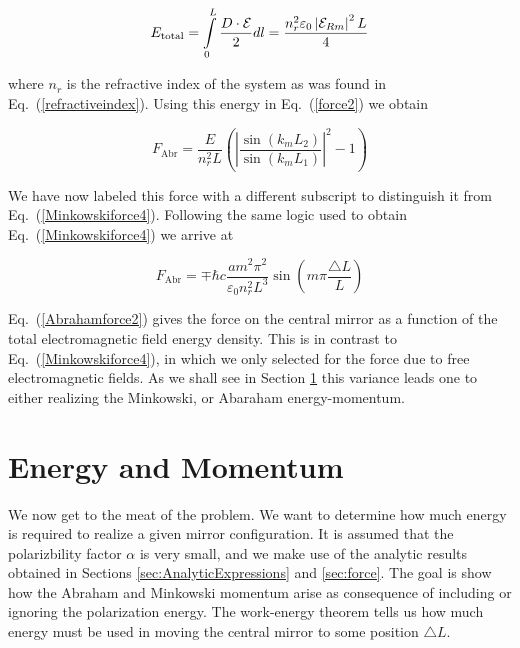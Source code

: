 \documentclass[twocolumn,english,pra,aps,superscriptaddress,floatfix]{revtex4-1}
\begin{document}
\begin{equation}
E_{\mathrm{total}}=\intop_{0}^{L}\frac{D\cdot \mathcal{E}}{2}dl=\frac{n_{r}^{2}\varepsilon_{0}\left| \mathcal{E}_{Rm}\right|^{2}L}{4}
\label{energydensity2}
\end{equation}

where $n_{r}$ is the refractive index of the system as was found in Eq.\ (\ref{refractiveindex}).
Using this energy in Eq.\ (\ref{force2}) we obtain

\begin{equation}
F_{\mathrm{Abr}}=\frac{E}{n_{r}^{2}L}\left(\left|\frac{\sin(k_{m}L_{2})}{\sin(k_{m}L_{1})}\right|^{2}-1\right)
\label{Abrahamforce1}
\end{equation}

We have now labeled this force with a different subscript to distinguish it from Eq.\ (\ref{Minkowskiforce4}).  
Following the same logic used to obtain Eq.\ (\ref{Minkowskiforce4}) we arrive at 

\begin{equation}
F_{\mathrm{Abr}}=\mp\hbar c\frac{a m^{2}\pi^{2}}{\varepsilon_{0}n_{r}^{2}L^{3}}\sin(m\pi\frac{\triangle L}{L})
\label{Abrahamforce2}
\end{equation}

Eq.\ (\ref{Abrahamforce2}) gives the force on the central mirror as a function of the total electromagnetic field energy density.  This is in contrast to Eq.\ (\ref{Minkowskiforce4}), in which we only selected for the force due to free electromagnetic fields.  As we shall see in Section \ref{sec:Energy} this variance leads one to either realizing the Minkowski, or Abaraham energy-momentum.  



\section{Energy and Momentum}
\label{sec:Energy}

We now get to the meat of the problem. We want to determine how much energy is required to realize a given mirror configuration. It is assumed that the polarizbility factor $\alpha$ is very small, and we make use of the analytic results obtained in Sections \ref{sec:AnalyticExpressions} and \ref{sec:force}.  The goal is show how the Abraham and Minkowski momentum arise as consequence of including or ignoring the polarization energy. The work-energy theorem tells us how much energy must be used in moving the central mirror to some position $\triangle L$.
\end{document}
